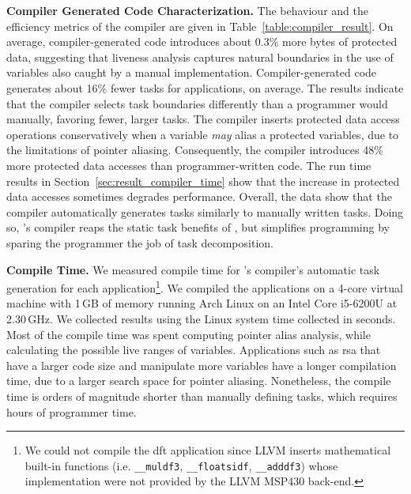 \textbf{\sys Compiler Generated Code Characterization.} The behaviour and the efficiency metrics of the \sys compiler are given in Table~\ref{table:compiler_result}. 
%
%
On average, compiler-generated code introduces about 0.3\% more bytes of protected data, suggesting that liveness analysis captures natural boundaries in the use of variables also caught by a manual implementation. Compiler-generated code generates about 16\% fewer tasks for applications, on average. The results indicate that the \sys compiler selects task boundaries differently than a programmer would manually, favoring fewer, larger tasks. The \sys compiler inserts protected data access operations conservatively when a variable {\em may} alias a protected variables, due to the limitations of pointer aliasing. Consequently, the \sys compiler introduces 48\% more protected data accesses than programmer-written code. The run time results in Section~\ref{sec:result_compiler_time} show that the increase in protected data
accesses sometimes degrades performance. Overall, the data show that the compiler automatically generates tasks similarly to manually written tasks. Doing so, \sys's compiler reaps the static task benefits of \sys, but simplifies programming by sparing the programmer the job of task decomposition.

\textbf{Compile Time.} We measured compile time for \sys's compiler's automatic task generation for each application\footnote{We could not compile the dft application since LLVM inserts mathematical built-in functions (i.e. \texttt{\_\_muldf3}, \texttt{\_\_floatsidf}, \texttt{\_\_adddf3}) whose implementation were not provided by the LLVM MSP430 back-end.}. We compiled the applications on a 4-core virtual machine with 1\,GB of memory running Arch Linux on an Intel Core i5-6200U at 2.30\,GHz. We collected results using the Linux system time collected in seconds. Most of the compile time was spent computing pointer alias analysis, while calculating the possible live ranges of variables. Applications such as rsa that have a larger code size and manipulate more variables have a longer compilation time, due to a larger search space for pointer aliasing. Nonetheless, the compile time is orders of magnitude shorter than manually defining tasks, which requires hours of programmer time. %

